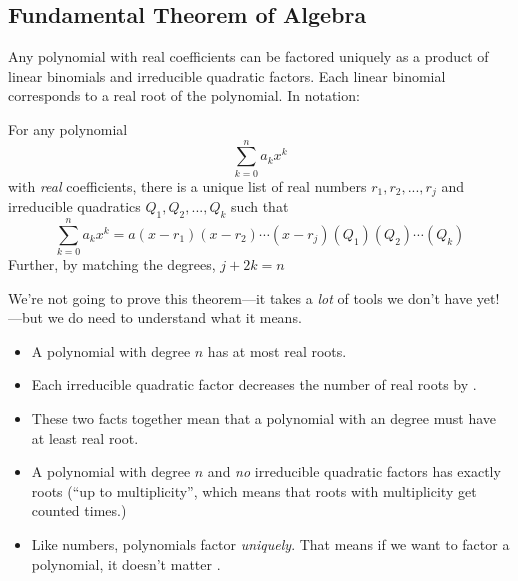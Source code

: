 \subsection{Fundamental Theorem of Algebra} 
\begin{theorem}
Any polynomial with real coefficients can be factored uniquely as a product of linear binomials and irreducible quadratic factors. Each linear binomial corresponds to a real root of the polynomial. In notation:

For any polynomial
\[
\sum_{k=0}^n{a_k x^k}
\]
with \emph{real} coefficients, there is a unique list of real numbers $r_1,r_2,...,r_j$ and irreducible quadratics $Q_1,Q_2,...,Q_k$ such that
\[
\sum_{k=0}^n{a_k x^k}
=
a(x-r_1)(x-r_2)\cdots(x-r_j)(Q_1)(Q_2)\cdots(Q_k)
\]
Further, by matching the degrees, $j+2k=n$
\end{theorem}
We're not going to prove this theorem---it takes a \emph{lot} of tools we don't have yet!---but we do need to understand what it means.
\begin{itemize}
\item A polynomial with degree $n$ has at most \makeblanksmall real roots.
\item Each irreducible quadratic factor decreases the number of real roots by \makeblank[0.4in].
\item These two facts together mean that a polynomial with an \makeblank[1in] degree must have at least \makeblanksmall real root.
\item A polynomial with degree $n$ and \emph{no} irreducible quadratic factors has exactly \makeblanksmall roots (``up to multiplicity'', which means that roots with multiplicity \makeblanksmall get counted \makeblanksmall times.)
\item Like numbers, polynomials factor \emph{uniquely}. That means if we want to factor a polynomial, it doesn't matter \makeblank.
\end{itemize}
